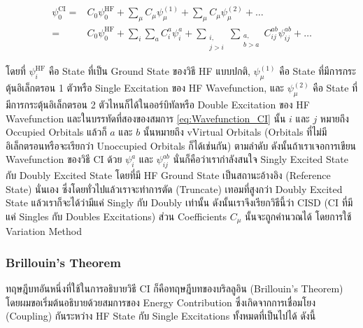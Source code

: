 \begin{equation}
    \label{eq:Wavefunction_CI}
    \begin{aligned}    
        \psi_0^{\mathrm{CI}} 
        = & 
        C_0 \psi_0^{\mathrm{HF}} 
        + \sum_\mu C_\mu \psi_\mu^{(1)} 
        + \sum_\mu C_\mu \psi_\mu^{(2) } 
        + \ldots \\
        = & C_0 \psi_0^{\mathrm{HF}} 
        +\sum_i \sum_a C_i^a \psi_i^a 
        + \sum_{\substack{i, \\ j>i}} \sum_{\substack{a, \\ b>a}} C_{i j}^{a b} \psi_{i j}^{a b} 
        + \ldots
    \end{aligned}
\end{equation}

\noindent โดยที่ $\psi_i^{\mathrm{HF}}$ คือ State ที่เป็น Ground State ของวิธี HF แบบปกติ, $\psi_\mu^{(1)}$ คือ State 
ที่มีการกระตุ้นอิเล็กตรอน 1 ตัวหรือ Single Excitation ของ HF Wavefunction, และ $\psi_\mu^{(2)}$ คือ State ที่มีการกระตุ้นอิเล็กตรอน 
2 ตัวไหนก็ได้ในออร์บิทัลหรือ Double Excitation ของ HF Wavefunction และในบรรทัดที่สองของสมการ \ref{eq:Wavefunction_CI} นั้น 
$i$ และ $j$ หมายถึง Occupied Orbitals แล้วก็ $a$ และ $b$ นั้นหมายถึง vVirtual Orbitals (Orbitals ที่ไม่มีอิเล็กตรอนหรือจะเรียกว่า 
Unoccupied Orbitals ก็ได้เช่นกัน) ตามลำดับ ดังนั้นถ้าเราเจอการเขียน Wavefunction ของวิธี CI ด้วย $\psi_i^a$ และ $\psi_{i j}^{a b}$ 
นั่นก็คือว่าเรากำลังสนใจ Singly Excited State กับ Doubly Excited State โดยที่มี HF Ground State เป็นสถานะอ้างอิง (Reference 
State) นั่นเอง ซึ่งโดยทั่วไปแล้วเราจะทำการตัด (Truncate) เทอมที่สูงกว่า Doubly Excited State แล้วเราก็จะได้ว่ามีแค่ Singly กับ Doubly 
เท่านั้น ดังนั้นเราจึงเรียกวิธีนี้ว่า CISD (CI ที่มีแค่ Singles กับ Doubles Excitations) ส่วน Coefficients $C_\mu$ นั้นจะถูกคำนวณได้%
โดยการใช้ Variation Method

\subsubsection{Brillouin's Theorem}

ทฤษฎีบทอันหนึ่งที่ใช้ในการอธิบายวิธี CI ก็คือทฤษฎีบทของบริลลูอิน (Brillouin's Theorem) โดยผมขอเริ่มต้นอธิบายด้วยสมการของ Energy 
Contribution ซึ่งเกิดจากการเชื่อมโยง (Coupling) กันระหว่าง HF State กับ Single Excitations ทั้งหมดที่เป็นไปได้ ดังนี้


